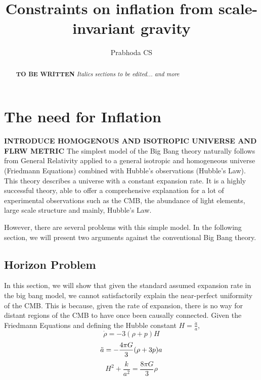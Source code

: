 \documentclass[aps,prd,reprint,preprintnumbers,showpacs,floatfix,nofootinbib,superscript address]{revtex4-2}
\begin{document}
\title{Constraints on inflation from scale-invariant gravity}

\author{Prabhoda CS}

\begin{abstract}

\textbf{TO BE WRITTEN}
\textit{Italics sections to be edited... and more}
\end{abstract}

\maketitle


\section{The need for Inflation}\label{The need for Inflation}
\textbf{INTRODUCE HOMOGENOUS AND ISOTROPIC UNIVERSE AND FLRW METRIC}
\indent The simplest model of the Big Bang theory naturally follows from General Relativity applied to a general isotropic and homogeneous universe (Friedmann Equations) combined with Hubble's observations (Hubble's Law). This theory describes a universe with a constant expansion rate. It is a highly successful theory, able to offer a comprehensive explanation for a lot of experimental observations such as the CMB, the abundance of light elements, large scale structure and mainly, Hubble's Law.

However, there are several problems with this simple model. In the following section, we will present two arguments against the conventional Big Bang theory.

\subsection{Horizon Problem}
In this section, we will show that given the standard assumed expansion rate in the big bang model, we cannot satisfactorily explain the near-perfect uniformity of the CMB. This is because, given the rate of expansion, there is no way for distant regions of the CMB to have once been causally connected.
Given the Friedmann Equations and defining the Hubble constant $H = \frac{\dot{a}}{a}$,
\begin{equation} \label{1}
    \dot{\rho} = -3(\rho + p)H
\end{equation}
\begin{equation} \label{2}
    \Ddot{a} = -\frac{4\pi G}{3} (\rho + 3p)a
\end{equation}
\begin{equation}    \label{3}
    H^2 + \frac{k}{a^2} = \frac{8 \pi G}{3} \rho
\end{equation}
\end{document}
